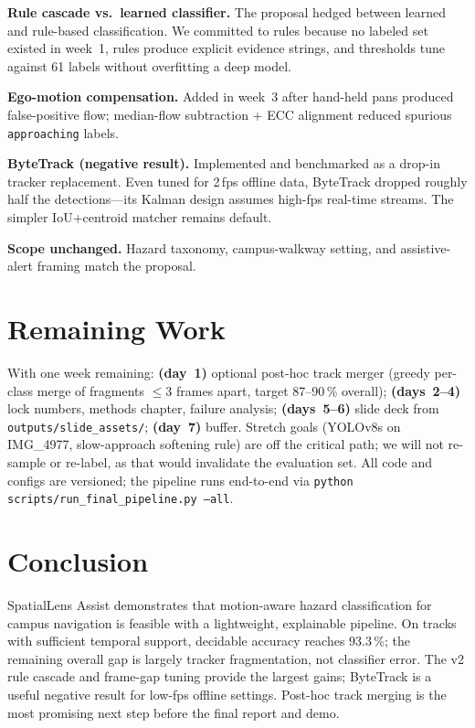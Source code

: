 \documentclass[10pt,twocolumn,letterpaper]{article}
\begin{document}
\textbf{Rule cascade vs.\ learned classifier.} The proposal hedged between learned and rule-based classification. We committed to rules because no labeled set existed in week~1, rules produce explicit evidence strings, and thresholds tune against 61 labels without overfitting a deep model.

\textbf{Ego-motion compensation.} Added in week~3 after hand-held pans produced false-positive flow; median-flow subtraction + ECC alignment reduced spurious \texttt{approaching} labels.

\textbf{ByteTrack (negative result).} Implemented and benchmarked as a drop-in tracker replacement. Even tuned for 2\,fps offline data, ByteTrack dropped roughly half the detections---its Kalman design assumes high-fps real-time streams. The simpler IoU+centroid matcher remains default.

\textbf{Scope unchanged.} Hazard taxonomy, campus-walkway setting, and assistive-alert framing match the proposal.

\section{Remaining Work}

With one week remaining: \textbf{(day~1)} optional post-hoc track merger (greedy per-class merge of fragments $\le$3 frames apart, target 87--90\,\% overall); \textbf{(days~2--4)} lock numbers, methods chapter, failure analysis; \textbf{(days~5--6)} slide deck from \texttt{outputs/slide\_assets/}; \textbf{(day~7)} buffer. Stretch goals (YOLOv8s on IMG\_4977, slow-approach softening rule) are off the critical path; we will not re-sample or re-label, as that would invalidate the evaluation set. All code and configs are versioned; the pipeline runs end-to-end via \texttt{python scripts/run\_final\_pipeline.py --all}.

\section{Conclusion}

SpatialLens Assist demonstrates that motion-aware hazard classification for campus navigation is feasible with a lightweight, explainable pipeline. On tracks with sufficient temporal support, decidable accuracy reaches 93.3\,\%; the remaining overall gap is largely tracker fragmentation, not classifier error. The v2 rule cascade and frame-gap tuning provide the largest gains; ByteTrack is a useful negative result for low-fps offline settings. Post-hoc track merging is the most promising next step before the final report and demo.
\end{document}

